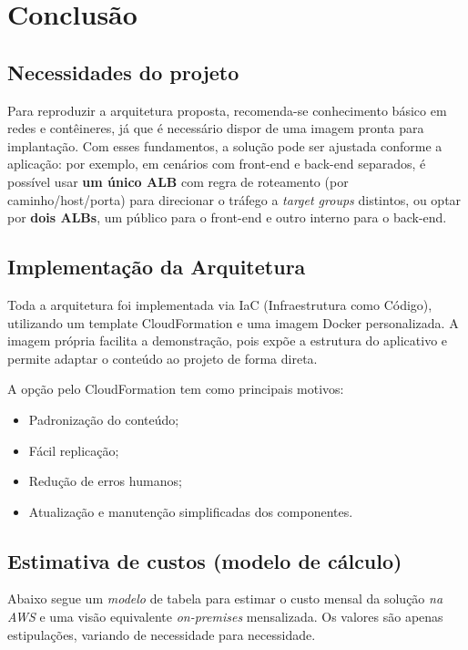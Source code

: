\chapter{Conclusão}
\label{sec:conclusao}

\section{Necessidades do projeto}
Para reproduzir a arquitetura proposta, recomenda-se conhecimento básico em redes e contêineres, já que é necessário dispor de uma imagem pronta para implantação. Com esses fundamentos, a solução pode ser ajustada conforme a aplicação: por exemplo, em cenários com front-end e back-end separados, é possível usar \textbf{um único ALB} com regra de roteamento (por caminho/host/porta) para direcionar o tráfego a \textit{target groups} distintos, ou optar por \textbf{dois ALBs}, um público para o front-end e outro interno para o back-end.


\section{Implementação da Arquitetura}
Toda a arquitetura foi implementada via IaC (Infraestrutura como Código), utilizando um template CloudFormation e uma imagem Docker personalizada. A imagem própria facilita a demonstração, pois expõe a estrutura do aplicativo e permite adaptar o conteúdo ao projeto de forma direta.

A opção pelo CloudFormation tem como principais motivos:
\begin{itemize}
  \item Padronização do conteúdo;
  \item Fácil replicação;
  \item Redução de erros humanos;
  \item Atualização e manutenção simplificadas dos componentes.
\end{itemize}

\section{Estimativa de custos (modelo de cálculo)}
Abaixo segue um \textit{modelo} de tabela para estimar o custo mensal da solução \textit{na AWS} e uma visão equivalente \textit{on-premises} mensalizada. Os valores são apenas estipulações, variando de necessidade para necessidade.

